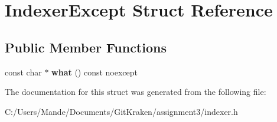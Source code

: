 \hypertarget{struct_indexer_except}{}\section{Indexer\+Except Struct Reference}
\label{struct_indexer_except}
\subsection*{Public Member Functions}
\begin{DoxyCompactItemize}
\item 
\mbox{\label{struct_indexer_except_ab6800c9f380eb6961629deec3dead97d}} 
const char $\ast$ {\bfseries what} () const noexcept
\end{DoxyCompactItemize}


The documentation for this struct was generated from the following file\+:\begin{DoxyCompactItemize}
\item 
C\+:/\+Users/\+Mande/\+Documents/\+Git\+Kraken/assignment3/indexer.\+h\end{DoxyCompactItemize}
